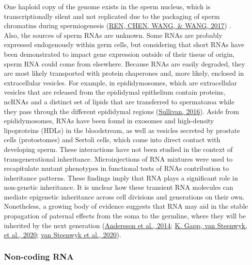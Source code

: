 \documentclass[12pt,twoside]{reedthesis}
\begin{document}
One haploid copy of the genome exists in the sperm nucleus, which is
transcriptionally silent and not replicated due to the packaging of
sperm chromatins during spermiogenesis (\protect\hyperlink{ref-ren2017}{REN, CHEN, WANG, \& WANG, 2017}) . Also, the sources of
sperm RNAs are unknown. Some RNAs are probably expressed endogenously
within germ cells, but considering that short RNAs have been
demonstrated to impact gene expression outside of their tissue of
origin, sperm RNA could come from elsewhere. Because RNAs are easily
degraded, they are most likely transported with protein chaperones and,
more likely, enclosed in extracellular vesicles. For example, in
epididymosomes, which are extracellular vesicles that are released from
the epididymal epithelium contain proteins, ncRNAs and a distinct set of
lipids that are transferred to spermatozoa while they pass through the
different epididymal regions (\protect\hyperlink{ref-sullivan2016}{Sullivan, 2016}). Aside from epididymosomes,
RNAs have been found in exosomes and high-density lipoproteins (HDLs) in
the bloodstream, as well as vesicles secreted by prostate cells
(protostomes) and Sertoli cells, which come into direct contact with
developing sperm. These interactions have not been studied in the
context of transgenerational inheritance. Microinjections of RNA
mixtures were used to recapitulate mutant phenotypes in functional tests
of RNAs contribution to inheritance patterns. These findings imply that
RNA plays a significant role in non-genetic inheritance. It is unclear
how these transient RNA molecules can mediate epigenetic inheritance
across cell divisions and generations on their own. Nonetheless, a
growing body of evidence suggests that RNA may aid in the stable
propagation of paternal effects from the soma to the germline, where
they will be inherited by the next generation (\protect\hyperlink{ref-andersson2014}{Andersson et al., 2014}; \protect\hyperlink{ref-gapp2020}{K. Gapp, van Steenwyk, et al., 2020}; \protect\hyperlink{ref-vansteenwyk2020}{van Steenwyk et al., 2020}).

\hypertarget{non-coding-rna}{%
\subsubsection*{Non-coding RNA}\label{non-coding-rna}}
\end{document}
